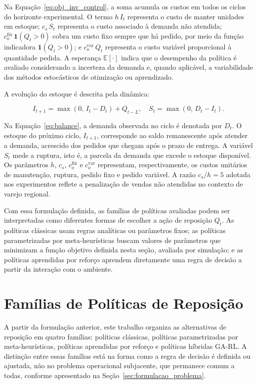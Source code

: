 Na Equação~\ref{eq:obj_inv_control}, a soma acumula os custos em todos os ciclos do horizonte experimental. O termo $h\,I_t$ representa o custo de manter unidades em estoque; $c_s\,S_t$ representa o custo associado à demanda não atendida; $c_o^{\text{fix}}\,\mathbf{1}(Q_t>0)$ cobra um custo fixo sempre que há pedido, por meio da função indicadora $\mathbf{1}(Q_t>0)$; e $c_o^{\text{var}}\,Q_t$ representa o custo variável proporcional à quantidade pedida. A esperança $\mathbb{E}[\cdot]$ indica que o desempenho da política é avaliado considerando a incerteza da demanda e, quando aplicável, a variabilidade dos métodos estocásticos de otimização ou aprendizado.

A evolução do estoque é descrita pela dinâmica:

\begin{equation}
  I_{t+1} = \max(0,\, I_t - D_t) + Q_{t-L}, \quad S_t = \max(0,\, D_t - I_t).
  \label{eq:balance}
\end{equation}

Na Equação~\ref{eq:balance}, a demanda observada no ciclo é denotada por $D_t$. O estoque do próximo ciclo, $I_{t+1}$, corresponde ao saldo remanescente após atender a demanda, acrescido dos pedidos que chegam após o prazo de entrega. A variável $S_t$ mede a ruptura, isto é, a parcela da demanda que excede o estoque disponível. Os parâmetros $h$, $c_s$, $c_o^{\text{fix}}$ e $c_o^{\text{var}}$ representam, respectivamente, os custos unitários de manutenção, ruptura, pedido fixo e pedido variável. A razão $c_s/h = 5$ adotada nos experimentos reflete a penalização de vendas não atendidas no contexto de varejo regional.

Com essa formulação definida, as famílias de políticas avaliadas podem ser interpretadas como diferentes formas de escolher a ação de reposição $Q_t$. As políticas clássicas usam regras analíticas ou parâmetros fixos; as políticas parametrizadas por meta-heurísticas buscam valores de parâmetros que minimizam a função objetivo definida nesta seção, avaliada por simulação; e as políticas aprendidas por reforço aprendem diretamente uma regra de decisão a partir da interação com o ambiente.

\section{Famílias de Políticas de Reposição}
\label{sec:politicas_reposicao}

A partir da formulação anterior, este trabalho organiza as alternativas de reposição em quatro famílias: políticas clássicas, políticas parametrizadas por meta-heurísticas, políticas aprendidas por reforço e políticas híbridas GA-RL. A distinção entre essas famílias está na forma como a regra de decisão é definida ou ajustada, não no problema operacional subjacente, que permanece comum a todas, conforme apresentado na Seção~\ref{sec:formulacao_problema}.

